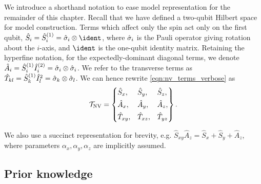 We introduce a shorthand notation to ease model representation for the remainder of this chapter. 
Recall that we have defined a two-qubit Hilbert space for model construction.
Terms which affect only the spin act only on the first qubit, $\hat{S}_i = \hat{S}_i^{(1)} = \s_i \otimes \ident$, 
    where $\hat{\sigma}_i$ is the Pauli operator giving rotation about the $i$-axis, and 
    $\ident$ is the one-qubit identity matrix. 
Retaining the hyperfine notation, for the expectedly-dominant diagonal terms, we denote $\hat{A}_i = \hat{S}_i^{(1)} \hat{I}_i^{(2)} = \hat{\sigma}_i \otimes \hat{\sigma}_i$. 
We refer to the transverse terms as $\hat{T}_{kl} = \hat{S}_k^{(1)} \hat{I}_l^{2} = \hat{\sigma}_k \otimes \hat{\sigma}_l$. 
We can hence rewrite \cref{eqn:nv_terms_verbose} as 
\begin{equation}
    \label{eqn:nv_terms}
    \mathcal{T}_{\textrm{NV}} = \left\{ 
        \begin{split}    
            &\hat{S}_x, && \hat{S}_y,  && \hat{S}_z, \\
            &\hat{A}_x,  && \hat{A}_y,  && \hat{A}_z, \\
            &\hat{T}_{xy},  && \hat{T}_{xz}, && \hat{T}_{yz} 
        \end{split}
    \right\}.
\end{equation}

We also use a succinct representation for brevity, e.g. $\hat{S}_{xy}\hat{A}_z =  \hat{S}_x + \hat{S}_y + \hat{A}_z$, 
    where parameters $\alpha_x, \alpha_y, \alpha_z$ are implicitly assumed. 

\subsection{Prior knowledge}


